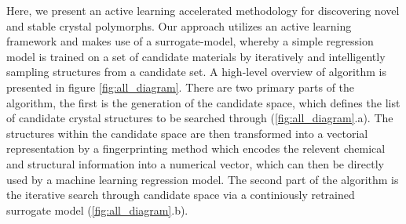 
%
%
%
%
%



%
%
Here, we present an active learning accelerated methodology for discovering novel and stable crystal polymorphs.
%
Our approach utilizes an active learning framework and makes use of a surrogate-model,
whereby a simple regression model is trained on a set of candidate materials by iteratively and intelligently sampling structures from a candidate set.
%
A high-level overview of algorithm is presented in figure \ref{fig:all_diagram}.
There are two primary parts of the algorithm, the first is the generation of the candidate space,
which defines the list of candidate crystal structures to be searched through (\ref{fig:all_diagram}.a).
%
The structures within the candidate space are then transformed into a vectorial representation by a fingerprinting method which encodes the relevent chemical and structural information into a numerical vector,
which can then be directly used by a machine learning regression model.
%
The second part of the algorithm is the iterative search through candidate space via a continiously retrained surrogate model (\ref{fig:all_diagram}.b).


